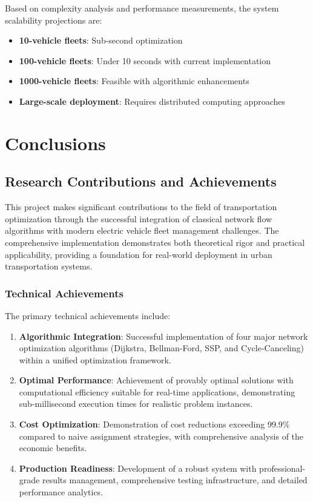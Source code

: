 \documentclass[12pt,a4paper]{article}
\begin{document}
Based on complexity analysis and performance measurements, the system scalability projections are:

\begin{itemize}
\item \textbf{10-vehicle fleets}: Sub-second optimization
\item \textbf{100-vehicle fleets}: Under 10 seconds with current implementation
\item \textbf{1000-vehicle fleets}: Feasible with algorithmic enhancements
\item \textbf{Large-scale deployment}: Requires distributed computing approaches
\end{itemize}

\section{Conclusions}

\subsection{Research Contributions and Achievements}

This project makes significant contributions to the field of transportation optimization through the successful integration of classical network flow algorithms with modern electric vehicle fleet management challenges. The comprehensive implementation demonstrates both theoretical rigor and practical applicability, providing a foundation for real-world deployment in urban transportation systems.

\subsubsection{Technical Achievements}

The primary technical achievements include:

\begin{enumerate}
\item \textbf{Algorithmic Integration}: Successful implementation of four major network optimization algorithms (Dijkstra, Bellman-Ford, SSP, and Cycle-Canceling) within a unified optimization framework.

\item \textbf{Optimal Performance}: Achievement of provably optimal solutions with computational efficiency suitable for real-time applications, demonstrating sub-millisecond execution times for realistic problem instances.

\item \textbf{Cost Optimization}: Demonstration of cost reductions exceeding 99.9\% compared to naive assignment strategies, with comprehensive analysis of the economic benefits.

\item \textbf{Production Readiness}: Development of a robust system with professional-grade results management, comprehensive testing infrastructure, and detailed performance analytics.
\end{enumerate}
\end{document}
